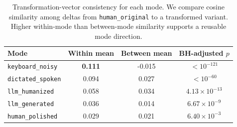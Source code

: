 \begin{table}[t]
    \centering
    \caption{Transformation-vector consistency for each mode. We compare cosine similarity among deltas from \texttt{human\_original} to a transformed variant. Higher within-mode than between-mode similarity supports a reusable mode direction.}
    \label{tab:delta_similarity}
    \begin{tabular}{@{}lccc@{}}
        \toprule
        Mode & Within mean & Between mean & BH-adjusted $p$ \\
        \midrule
        \texttt{keyboard\_noisy} & \textbf{0.111} & -0.015 & $< 10^{-121}$ \\
        \texttt{dictated\_spoken} & 0.094 & 0.027 & $< 10^{-60}$ \\
        \texttt{llm\_humanized} & 0.058 & 0.034 & $4.13 \times 10^{-13}$ \\
        \texttt{llm\_generated} & 0.036 & 0.014 & $6.67 \times 10^{-9}$ \\
        \texttt{human\_polished} & 0.029 & 0.021 & $6.40 \times 10^{-3}$ \\
        \bottomrule
    \end{tabular}
\end{table}
